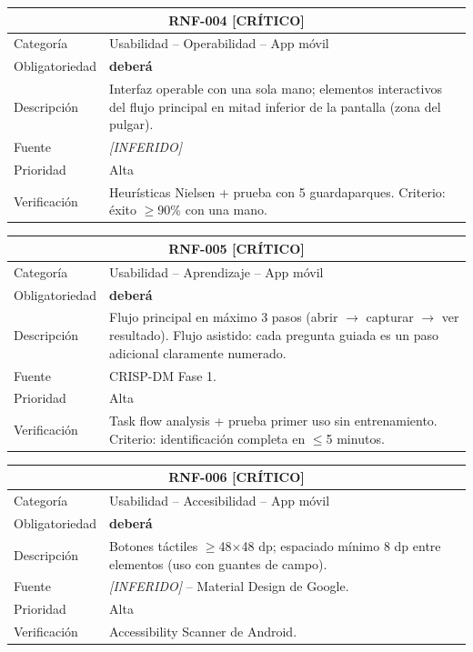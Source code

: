 \documentclass[12pt, a4paper]{article}
\newcommand{\criticomark}{\textcolor{criticolor}{\textbf{[CR\'ITICO]}}}
\newcommand{\inferido}{\textcolor{medio}{\textit{[INFERIDO]}}}
\begin{document}
\begin{longtable}{|p{3cm}|p{11.5cm}|}
\hline
\multicolumn{2}{|c|}{\textbf{RNF-004} \criticomark} \\
\hline
Categor\'ia & Usabilidad -- Operabilidad -- App m\'ovil \\
\hline
Obligatoriedad & \textbf{deber\'a} \\
\hline
Descripci\'on & Interfaz operable con una sola mano; elementos interactivos del flujo principal en mitad inferior de la pantalla (zona del pulgar). \\
\hline
Fuente & \inferido{} \\
\hline
Prioridad & Alta \\
\hline
Verificaci\'on & Heur\'isticas Nielsen + prueba con 5 guardaparques. Criterio: \'exito $\geq$90\% con una mano. \\
\hline
\end{longtable}

\begin{longtable}{|p{3cm}|p{11.5cm}|}
\hline
\multicolumn{2}{|c|}{\textbf{RNF-005} \criticomark} \\
\hline
Categor\'ia & Usabilidad -- Aprendizaje -- App m\'ovil \\
\hline
Obligatoriedad & \textbf{deber\'a} \\
\hline
Descripci\'on & Flujo principal en m\'aximo 3 pasos (abrir $\rightarrow$ capturar $\rightarrow$ ver resultado). Flujo asistido: cada pregunta guiada es un paso adicional claramente numerado. \\
\hline
Fuente & CRISP-DM Fase 1. \\
\hline
Prioridad & Alta \\
\hline
Verificaci\'on & Task flow analysis + prueba primer uso sin entrenamiento. Criterio: identificaci\'on completa en $\leq$5 minutos. \\
\hline
\end{longtable}

\begin{longtable}{|p{3cm}|p{11.5cm}|}
\hline
\multicolumn{2}{|c|}{\textbf{RNF-006} \criticomark} \\
\hline
Categor\'ia & Usabilidad -- Accesibilidad -- App m\'ovil \\
\hline
Obligatoriedad & \textbf{deber\'a} \\
\hline
Descripci\'on & Botones t\'actiles $\geq$48$\times$48 dp; espaciado m\'inimo 8 dp entre elementos (uso con guantes de campo). \\
\hline
Fuente & \inferido{} -- Material Design de Google. \\
\hline
Prioridad & Alta \\
\hline
Verificaci\'on & Accessibility Scanner de Android. \\
\hline
\end{longtable}
\end{document}
